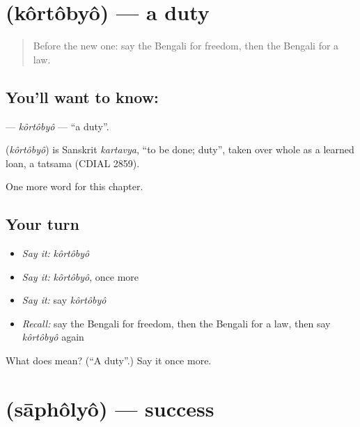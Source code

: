 \section[\texorpdfstring{\bn{কর্তব্য} (kôrtôbyô)}{কর্তব্য (kôrtôbyô)}]{ (kôrtôbyô) — a duty}

\label{lesson:BN-C200-kortobyo}



\begin{quote}
Before the new one: say the Bengali for freedom, then the Bengali for a law.
\end{quote}

\subsection*{You'll want to know: }
\textbf{} — \emph{kôrtôbyô} — \textquotedblleft{}a duty\textquotedblright{}.

\begin{cousinweb}
\textbf{} (\emph{kôrtôbyô}) is Sanskrit \emph{kartavya}, \textquotedblleft{}to be done; duty\textquotedblright{}, taken over whole as a learned loan, a tatsama (CDIAL 2859).
\end{cousinweb}

\begin{grammarlens}[title={What you've built}]
One more word for this chapter.
\end{grammarlens}

\subsection*{Your turn}
\begin{itemize}
\raggedright
  \item \emph{Say it:} \emph{kôrtôbyô}
  \item \emph{Say it:} \emph{kôrtôbyô}, once more
  \item \emph{Say it:} say \emph{kôrtôbyô}
  \item \emph{Recall:} say the Bengali for freedom, then the Bengali for a law, then say \emph{kôrtôbyô} again
\end{itemize}

\begin{tcolorbox}[breakable,colback=teal!4,colframe=teal!35!black,title={Before you move on}]
What does  mean? (\textquotedblleft{}A duty\textquotedblright{}.) Say it once more.
\end{tcolorbox}
\section[\texorpdfstring{\bn{সাফল্য} (sāphôlyô)}{সাফল্য (sāphôlyô)}]{ (sāphôlyô) — success}

